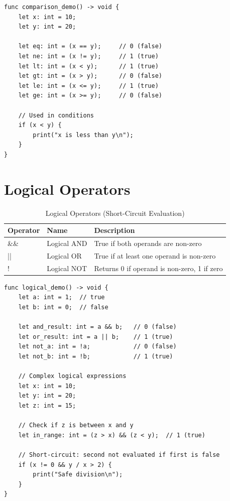 \documentclass[12pt,a4paper,oneside]{book}
\begin{document}
\begin{lstlisting}[style=algo, caption={Comparison Examples}]
func comparison_demo() -> void {
    let x: int = 10;
    let y: int = 20;
    
    let eq: int = (x == y);     // 0 (false)
    let ne: int = (x != y);     // 1 (true)
    let lt: int = (x < y);      // 1 (true)
    let gt: int = (x > y);      // 0 (false)
    let le: int = (x <= y);     // 1 (true)
    let ge: int = (x >= y);     // 0 (false)
    
    // Used in conditions
    if (x < y) {
        print("x is less than y\n");
    }
}
\end{lstlisting}

\section{Logical Operators}

\begin{table}[H]
\centering
\caption{Logical Operators (Short-Circuit Evaluation)}
\begin{tabularx}{\textwidth}{|l|l|X|}
\hline
\textbf{Operator} & \textbf{Name} & \textbf{Description} \\
\hline
\&\& & Logical AND & True if both operands are non-zero \\
|| & Logical OR & True if at least one operand is non-zero \\
! & Logical NOT & Returns 0 if operand is non-zero, 1 if zero \\
\hline
\end{tabularx}
\end{table}

\begin{lstlisting}[style=algo, caption={Logical Operations with Short-Circuit}]
func logical_demo() -> void {
    let a: int = 1;  // true
    let b: int = 0;  // false
    
    let and_result: int = a && b;   // 0 (false)
    let or_result: int = a || b;    // 1 (true)
    let not_a: int = !a;            // 0 (false)
    let not_b: int = !b;            // 1 (true)
    
    // Complex logical expressions
    let x: int = 10;
    let y: int = 20;
    let z: int = 15;
    
    // Check if z is between x and y
    let in_range: int = (z > x) && (z < y);  // 1 (true)
    
    // Short-circuit: second not evaluated if first is false
    if (x != 0 && y / x > 2) {
        print("Safe division\n");
    }
}
\end{lstlisting}
\end{document}
